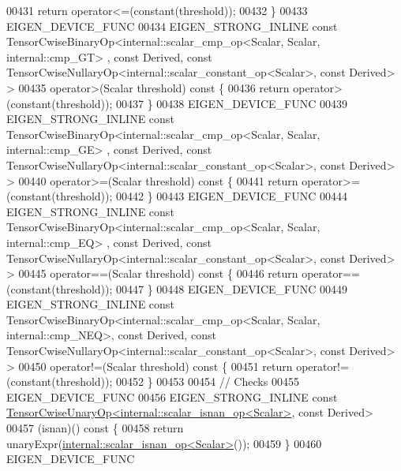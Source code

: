 \begin{DoxyCode}
00431       \textcolor{keywordflow}{return} operator<=(constant(threshold));
00432     \}
00433     EIGEN\_DEVICE\_FUNC
00434     EIGEN\_STRONG\_INLINE \textcolor{keyword}{const} TensorCwiseBinaryOp<internal::scalar\_cmp\_op<Scalar, Scalar, internal::cmp\_GT>
      , \textcolor{keyword}{const} Derived, \textcolor{keyword}{const} TensorCwiseNullaryOp<internal::scalar\_constant\_op<Scalar>, \textcolor{keyword}{const} Derived> >
00435     operator>(Scalar threshold)\textcolor{keyword}{ const }\{
00436       \textcolor{keywordflow}{return} operator>(constant(threshold));
00437     \}
00438     EIGEN\_DEVICE\_FUNC
00439     EIGEN\_STRONG\_INLINE \textcolor{keyword}{const} TensorCwiseBinaryOp<internal::scalar\_cmp\_op<Scalar, Scalar, internal::cmp\_GE>
      , \textcolor{keyword}{const} Derived, \textcolor{keyword}{const} TensorCwiseNullaryOp<internal::scalar\_constant\_op<Scalar>, \textcolor{keyword}{const} Derived> >
00440     operator>=(Scalar threshold)\textcolor{keyword}{ const }\{
00441       \textcolor{keywordflow}{return} operator>=(constant(threshold));
00442     \}
00443     EIGEN\_DEVICE\_FUNC
00444     EIGEN\_STRONG\_INLINE \textcolor{keyword}{const} TensorCwiseBinaryOp<internal::scalar\_cmp\_op<Scalar, Scalar, internal::cmp\_EQ>
      , \textcolor{keyword}{const} Derived, \textcolor{keyword}{const} TensorCwiseNullaryOp<internal::scalar\_constant\_op<Scalar>, \textcolor{keyword}{const} Derived> >
00445     operator==(Scalar threshold)\textcolor{keyword}{ const }\{
00446       \textcolor{keywordflow}{return} operator==(constant(threshold));
00447     \}
00448     EIGEN\_DEVICE\_FUNC
00449     EIGEN\_STRONG\_INLINE \textcolor{keyword}{const} TensorCwiseBinaryOp<internal::scalar\_cmp\_op<Scalar, Scalar,
       internal::cmp\_NEQ>, \textcolor{keyword}{const} Derived, \textcolor{keyword}{const} TensorCwiseNullaryOp<internal::scalar\_constant\_op<Scalar>, \textcolor{keyword}{const} Derived> >
00450     operator!=(Scalar threshold)\textcolor{keyword}{ const }\{
00451       \textcolor{keywordflow}{return} operator!=(constant(threshold));
00452     \}
00453 
00454     \textcolor{comment}{// Checks}
00455     EIGEN\_DEVICE\_FUNC
00456     EIGEN\_STRONG\_INLINE \textcolor{keyword}{const} 
      \hyperlink{class_eigen_1_1_tensor_cwise_unary_op}{TensorCwiseUnaryOp<internal::scalar\_isnan\_op<Scalar>}, \textcolor{keyword}{
      const} Derived>
00457     (isnan)()\textcolor{keyword}{ const }\{
00458       \textcolor{keywordflow}{return} unaryExpr(\hyperlink{struct_eigen_1_1internal_1_1scalar__isnan__op}{internal::scalar\_isnan\_op<Scalar>}());
00459     \}
00460     EIGEN\_DEVICE\_FUNC

\end{DoxyCode}
